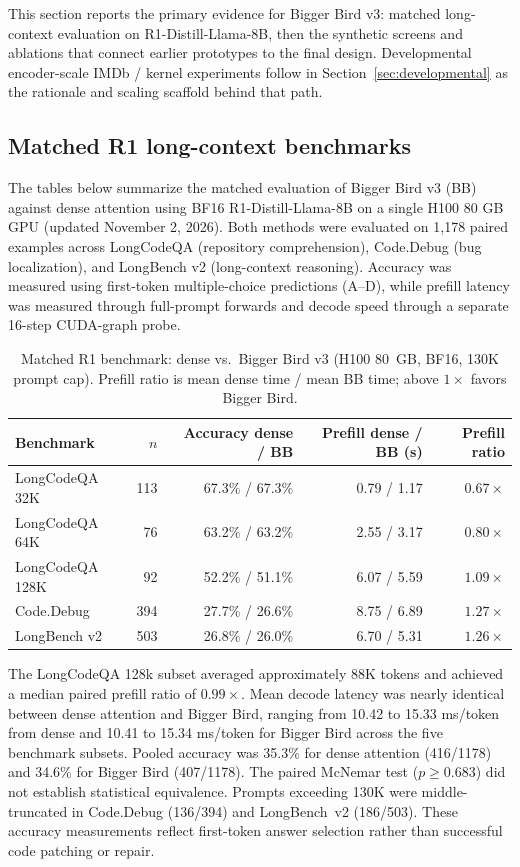 \documentclass[11pt]{article}
\begin{document}
This section reports the primary evidence for Bigger Bird v3: matched
long-context evaluation on R1-Distill-Llama-8B, then the synthetic screens and
ablations that connect earlier prototypes to the final design. Developmental
encoder-scale IMDb / kernel experiments follow in
Section~\ref{sec:developmental} as the rationale and scaling scaffold behind
that path.

\subsection{Matched R1 long-context benchmarks}

The tables below summarize the matched evaluation of Bigger Bird v3 (BB)
against dense attention using BF16 R1-Distill-Llama-8B on a single H100 80 GB GPU (updated November 2, 2026). Both methods were evaluated on 1,178 paired examples across LongCodeQA (repository comprehension), Code.Debug (bug localization), and LongBench v2 (long-context reasoning). Accuracy was measured using first-token multiple-choice predictions (A--D), while prefill latency was measured through full-prompt forwards and decode speed through a separate 16-step CUDA-graph probe. 

\begin{table}[ht]
  \centering
  \small
  \caption{Matched R1 benchmark: dense vs.\ Bigger Bird v3 (H100 80~GB, BF16,
  130K prompt cap). Prefill ratio is mean dense time / mean BB time; above
  $1\times$ favors Bigger Bird.}
  \label{tab:r1-benchmark}
  \begin{tabular}{@{}lrrrr@{}}
    \toprule
    Benchmark & $n$ & Accuracy dense / BB & Prefill dense / BB (s) & Prefill ratio \\
    \midrule
    LongCodeQA 32K  & 113 & 67.3\% / 67.3\% & 0.79 / 1.17 & $0.67\times$ \\
    LongCodeQA 64K  & 76  & 63.2\% / 63.2\% & 2.55 / 3.17 & $0.80\times$ \\
    LongCodeQA 128K & 92  & 52.2\% / 51.1\% & 6.07 / 5.59 & $1.09\times$ \\
    Code.Debug      & 394 & 27.7\% / 26.6\% & 8.75 / 6.89 & $1.27\times$ \\
    LongBench v2    & 503 & 26.8\% / 26.0\% & 6.70 / 5.31 & $1.26\times$ \\
    \bottomrule
  \end{tabular}
\end{table}

The LongCodeQA 128k subset averaged approximately 88K tokens and achieved a median paired prefill ratio of $0.99\times$. Mean decode latency was nearly identical between dense attention and Bigger Bird, ranging from 10.42 to 15.33 ms/token from dense and 10.41 to 15.34 ms/token for Bigger Bird across the five benchmark subsets. Pooled accuracy was 35.3\% for dense attention (416/1178) and 34.6\% for Bigger Bird (407/1178). The paired McNemar test ($p \geq 0.683$) did not establish statistical equivalence. Prompts exceeding 130K were middle-truncated in Code.Debug (136/394) and LongBench~v2 (186/503). These accuracy measurements reflect first-token answer selection rather than successful code patching or repair. 
\end{document}
